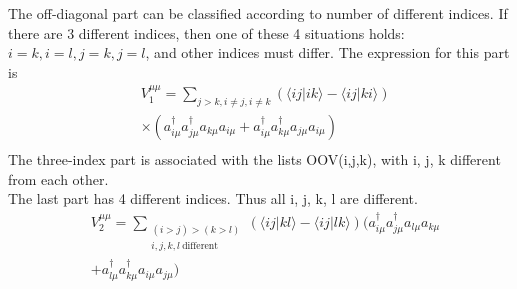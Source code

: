 \documentclass[twocolumn]{article}
\begin{document}
The off-diagonal part can be classified according to number of different indices. If there are 3 different indices, then one of these 4 situations holds:
$i=k,i=l,j=k,j=l$, and other indices must differ. The expression for this part is
\begin{equation}
  \begin{split}
    &V_1^{\mu\mu}=\sum_{j>k,i\neq j, i\neq k}(\langle ij|ik\rangle -\langle ij|ki\rangle )\\
    &\times(a_{i\mu}^{\dagger}a_{j\mu}^{\dagger}a_{k\mu}a_{i\mu}+a_{i\mu}^{\dagger}a_{k\mu}^{\dagger}a_{j\mu}a_{i\mu})\\
  \end{split}
  \label{eq:H2AAV1}
\end{equation}
The three-index part is associated with the lists OOV(i,j,k), with i, j, k different from each other.\\

The last part has 4 different indices. Thus all i, j, k, l are different.
\begin{equation}
  \begin{split}
    &V_2^{\mu\mu}=\sum_{\substack{(i>j)>(k>l)\\i,j,k,l\ \text{different}}}(\langle ij|kl\rangle -\langle ij|lk\rangle )(a_{i\mu}^{\dagger}a_{j\mu}^{\dagger}a_{l\mu}a_{k\mu}\\
    &+a_{l\mu}^{\dagger}a_{k\mu}^{\dagger}a_{i\mu}a_{j\mu})
  \end{split}
  \label{eq:H2AAV2}
\end{equation}
\end{document}

